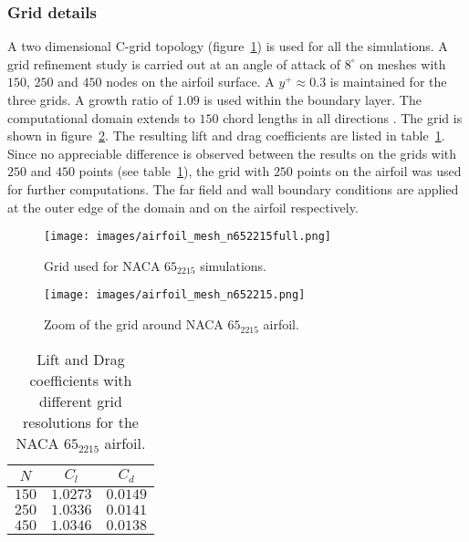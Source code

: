 \subsubsection{Grid details}
A two dimensional C-grid topology (figure~\ref{fig:n652215gridfull}) is used for all the simulations. A grid refinement study is carried out at an angle of attack of $8^\circ$ on meshes with $150$, $250$ and $450$ nodes on the airfoil surface. A $y^+ \approx 0.3$ is maintained for the three grids. A growth ratio of $1.09$ is used within the boundary layer. The computational domain extends to $150$ chord lengths in all directions . The grid is shown in figure~\ref{fig:n652215grid}. The resulting lift and drag coefficients are listed in table~\ref{tab:gridref}. Since no appreciable difference is observed between the results on the grids with $250$ and $450$ points (see table~\ref{tab:gridref}), the grid with $250$ points on the airfoil was used for further computations. The far field and wall boundary conditions are applied at the outer edge of the domain and on the airfoil respectively.
\begin{figure}[h]
    \centering
    \texttt{[image: images/airfoil\_mesh\_n652215full.png]}
    \caption{Grid used for NACA $65_2215$ simulations.}
    \label{fig:n652215gridfull}
\end{figure}
\begin{figure}[h]
    \centering
    \texttt{[image: images/airfoil\_mesh\_n652215.png]}
    \caption{Zoom of the grid around NACA $65_2215$ airfoil.}
    \label{fig:n652215grid}
\end{figure}
\begin{table}[h!]
\centering
\begin{tabular}{ |c|c|c| } 
\hline
$N$ & $C_l$ & $C_d$ \\
 \hline
 $150$ & $1.0273$ & $0.0149$ \\ 
 $250$ & $1.0336$ & $0.0141$ \\ 
 $450$ & $1.0346$ & $0.0138$ \\ 
 \hline
\end{tabular}
\caption{Lift and Drag coefficients with different grid resolutions for the NACA $65_2215$ airfoil.}
\label{tab:gridref}
\end{table}

